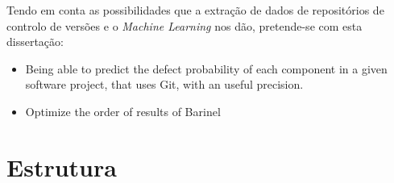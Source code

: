 Tendo em conta as possibilidades que a extração de dados de repositórios de controlo de versões e o \emph{Machine Learning} nos dão, pretende-se com esta dissertação:
%
\begin{itemize}
\item Being able to predict the defect probability of each component in a given software project, that uses Git, with an useful precision.
\item Optimize the order of results of Barinel
\end{itemize}

\section{Estrutura} \label{sec:struct}


